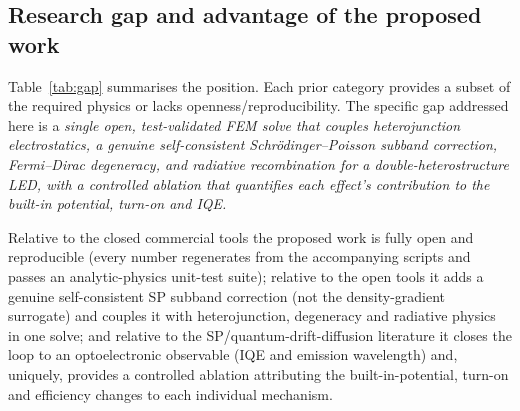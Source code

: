 \documentclass[conference]{IEEEtran}
\begin{document}
\subsection{Research gap and advantage of the proposed work}
Table~\ref{tab:gap} summarises the position. Each prior category provides a subset
of the required physics or lacks openness/reproducibility. The specific gap
addressed here is a \emph{single open, test-validated FEM solve that couples
heterojunction electrostatics, a genuine self-consistent Schr\"odinger--Poisson
subband correction, Fermi--Dirac degeneracy, and radiative recombination for a
double-heterostructure LED, with a controlled ablation that quantifies each
effect's contribution to the built-in potential, turn-on and IQE.}

Relative to the closed commercial tools the proposed work is fully open and
reproducible (every number regenerates from the accompanying scripts and passes an
analytic-physics unit-test suite); relative to the open tools it adds a genuine
self-consistent SP subband correction (not the density-gradient surrogate) and
couples it with heterojunction, degeneracy and radiative physics in one solve; and
relative to the SP/quantum-drift-diffusion literature it closes the loop to an
optoelectronic observable (IQE and emission wavelength) and, uniquely, provides a
controlled ablation attributing the built-in-potential, turn-on and efficiency
changes to each individual mechanism.
\end{document}
